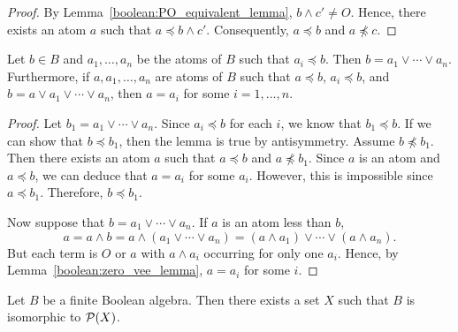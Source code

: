  
\begin{proof}
By  Lemma~\ref{boolean:PO_equivalent_lemma}, $b \wedge c' \neq O$. Hence, there exists an
atom $a$ such that $a \preceq b \wedge c'$. Consequently, $a \preceq
b$ and $a \not\preceq c$.
\end{proof}
 
 
\begin{lemma}\label{boolean:atoms_lemma}
Let $b \in B$ and $a_1, \ldots, a_n$ be the atoms of $B$ such that
$a_i \preceq b$. Then $b = a_1 \vee \cdots \vee a_n$. Furthermore, if
$a, a_1, \ldots, a_n$ are atoms of $B$ such that $a \preceq b$, $a_i
\preceq b$, and $b = a \vee a_1 \vee \cdots \vee a_n$, then $a = a_i$
for some $i = 1, \ldots, n$.    
\end{lemma} 
 
 
\begin{proof}
Let $b_1 =   a_1 \vee \cdots \vee a_n$. Since $a_i \preceq b$ for each
$i$, we know that $b_1 \preceq b$.  If we can show that $b \preceq
b_1$, then the lemma is true by antisymmetry.  Assume $b \not\preceq
b_1$. Then there exists an atom $a$ such that $a \preceq b$ and $a
\not\preceq b_1$.  Since $a$ is an atom and $a \preceq b$, we can
deduce that $a = a_i$ for  some $a_i$. However, this is impossible
since $a \preceq b_1$. Therefore, $b \preceq b_1$. 
 
 
Now suppose that $b = a_1 \vee \cdots \vee a_n$. If $a$ is an atom
less than $b$, 
\[
a 
= a \wedge b 
= a \wedge( a_1 \vee \cdots \vee a_n ) 
= (a \wedge a_1) \vee \cdots \vee ( a \wedge a_n ).
\]
But each term is $O$ or $a$ with $a \wedge a_i$ occurring for only one
$a_i$. Hence, by Lemma~\ref{boolean:zero_vee_lemma}, $a = a_i$ for some $i$.
\end{proof}
 
 
\begin{theorem}\label{boolean:classification_boolean_algebra}
Let $B$ be a finite Boolean algebra.  Then there exists a set $X$ such
that $B$ is isomorphic to ${\cal P}(X)$. 
\end{theorem} 
 
